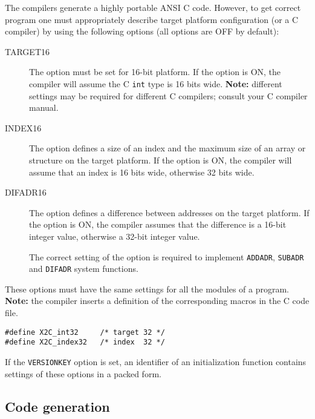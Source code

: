 The \xds{}  compilers  generate a highly  portable  ANSI  C  code.
However,  to  get  correct program one must appropriately describe
target  platform  configuration  (or  a  C  compiler) by using the
following options (all options are OFF by default):
\begin{description}
\item[TARGET16]  \mbox{}

        The option must be set for 16-bit platform.
        If the option is ON, the compiler will assume the C {\tt int}
        type is 16 bits wide.
        {\bf Note:} different settings may be required for
        different C compilers; consult your C compiler manual.

\item[INDEX16]    \mbox{}

        The option defines a size of an index and the maximum size of
        an array or structure on the target platform.
        If the option is ON, the compiler will assume that
        an index is 16 bits wide, otherwise 32 bits wide.

\item[DIFADR16]  \mbox{}

        The option defines a difference between addresses
        on the target  platform.
        If the option is ON, the compiler assumes that the difference
        is a 16-bit integer value, otherwise a 32-bit integer value.

        The correct setting of the option is required to
        implement {\tt ADDADR}, {\tt SUBADR} and {\tt DIFADR}
        system functions.
\end{description}

These options must have the same settings for all the modules
of a program. {\bf Note:} the compiler inserts a definition of
the corresponding macros in the C code file.
\begin{verbatim}
#define X2C_int32     /* target 32 */
#define X2C_index32   /* index  32 */
\end{verbatim}

If the {\tt VERSIONKEY} option is set, an identifier of
an initialization function contains settings of these options
in a packed form.

\subsection{Code generation}\label{maptoc:opt:gen}

